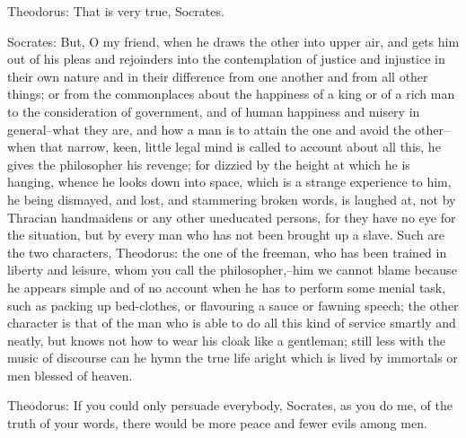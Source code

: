 Theodorus: That is very true, Socrates.

Socrates: But, O my friend, when he draws the other into upper air,
and gets him out of his pleas and rejoinders into the contemplation of
justice and injustice in their own nature and in their difference from
one another and from all other things; or from the commonplaces about
the happiness of a king or of a rich man to the consideration of
government, and of human happiness and misery in general--what they
are, and how a man is to attain the one and avoid the other--when that
narrow, keen, little legal mind is called to account about all this, he
gives the philosopher his revenge; for dizzied by the height at which
he is hanging, whence he looks down into space, which is a strange
experience to him, he being dismayed, and lost, and stammering
broken words, is laughed at, not by Thracian handmaidens or any other
uneducated persons, for they have no eye for the situation, but by every
man who has not been brought up a slave. Such are the two characters,
Theodorus: the one of the freeman, who has been trained in liberty and
leisure, whom you call the philosopher,--him we cannot blame because
he appears simple and of no account when he has to perform some menial
task, such as packing up bed-clothes, or flavouring a sauce or fawning
speech; the other character is that of the man who is able to do all
this kind of service smartly and neatly, but knows not how to wear his
cloak like a gentleman; still less with the music of discourse can he
hymn the true life aright which is lived by immortals or men blessed of
heaven.

Theodorus: If you could only persuade everybody, Socrates, as you do me,
of the truth of your words, there would be more peace and fewer evils
among men.

